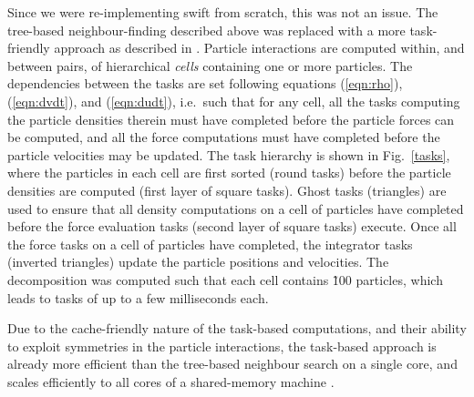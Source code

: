 \documentclass{sig-alternate-05-2015}
\newcommand{\eqn}[1] {(\ref{eqn:#1})}
\newcommand{\swift}{{\sc swift}\xspace}
\begin{document}
Since we were re-implementing \swift from scratch, this was not an issue.
The tree-based neighbour-finding described above was replaced with a more
task-friendly approach as described in \cite{ref:Gonnet2015}.
Particle interactions are computed within, and between pairs, of
hierarchical {\em cells} containing one or more particles.
The dependencies between the tasks are set following
equations \eqn{rho}, \eqn{dvdt}, and \eqn{dudt}, i.e.~such that for any cell,
all the tasks computing the particle densities therein must have
completed before the particle forces can be computed, and all the
force computations must have completed before the particle velocities
may be updated.
The task hierarchy is shown in Fig.~\ref{tasks}, where the particles in each
cell are first sorted (round tasks) before the particle densities
are computed (first layer of square tasks).
Ghost tasks (triangles) are used to ensure that all density computations
on a cell of particles have completed before the force evaluation tasks
(second layer of square tasks) execute.
Once all the force tasks on a cell of particles have completed,
the integrator tasks (inverted triangles) update the particle positions 
and velocities.
The decomposition was computed such that each cell contains \~100 particles,
which leads to tasks of up to a few milliseconds each.

Due to the cache-friendly nature of the task-based computations, 
and their ability to exploit symmetries in the particle interactions,
the task-based approach is already more efficient than the tree-based
neighbour search on a single core, and scales efficiently to all
cores of a shared-memory machine \cite{ref:Gonnet2015}.
\end{document}
